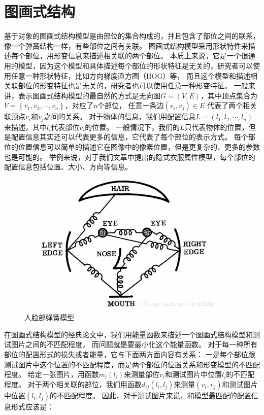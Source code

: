 \section{图画式结构}
基于对象的图画式结构模型是由部位的集合构成的，并且包含了部位之间的联系，像一个弹簧结构一样，有些部位之间有关联。
图画式结构模型采用形状特性来描述每个部位，用形变信息来描述相关联的两个部位。
本质上来说，它是一个很通用的模型，因为这个模型和具体描述每个部位的形状特征是无关的，研究者可以使用任意一种形状特征，比如方向梯度直方图（HOG）等，
而且这个模型和描述相关联部位的形变特征也是无关的，研究者也可以使用任意一种形变特征。
一般来讲，表示图画式结构模型的最自然的方式是无向图$G=(V, E)$，其中顶点集合为$V = \left\{v_1, v_2, \cdots, v_n \right\}$，对应了n个部位，
任意一条边$(v_i, v_j) \in E$ 代表了两个相关联顶点$v_i$和$v_j$之间的关系。
对于物体的信息，我们用配置信息$L = (l_1, l_2, \cdots, l_n)$ 来描述，其中$l_i$代表部位$v_i$的位置。
一般情况下，我们的$L$只代表物体的位置，但是配置信息其实还可以代表更多的信息，它代表了每个部位的表示方式。
每个部位的位置信息可以简单的描述它在图像中的像素位置，但是更复杂的、更多的参数也是可能的。
举例来说，对于我们文章中提出的隐式衣服属性模型，每个部位的配置信息包括位置、大小、方向等信息。

\begin{figure}
\centering
\includegraphics[width=0.9\textwidth]{img/ps.jpg}
\caption{人脸部弹簧模型}
\label{fig:ps}
\end{figure}

在图画式结构模型的经典论文\cite{ps1}中，我们用能量函数来描述一个图画式结构模型和测试图片之间的不匹配程度，
而问题就是要最小化这个能量函数。
对于每一种所有部位的配置形式的损失或者能量，它与下面两方面内容有关系：
一是每个部位跟测试图片中这个位置的不匹配程度，而是两个部位的位置关系和形变模型的不匹配程度。
给定一张图片，用函数$m_i(l_i)$来测量部位$v_i$和测试图片中位置$l_i$的不匹配程度。
对于两个相关联的部位，我们用函数$d_{ij}(l_i, l_j)$来测量$(v_i, v_j)$和测试图片中位置$(l_i, l_j)$的不匹配程度。
因此，对于测试图片来说，和模型最匹配的配置信息形式应该是：


